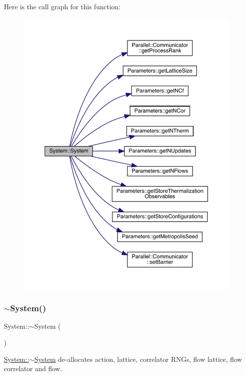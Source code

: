 Here is the call graph for this function\+:\nopagebreak
\begin{figure}[H]
\begin{center}
\leavevmode
\includegraphics[width=350pt]{class_system_ae317936c9bcf1374d61745572e0f2f8a_cgraph}
\end{center}
\end{figure}
\mbox{\label{class_system_a3be70bb338e3f062f821173fd15680d0}} 
\subsubsection{\texorpdfstring{$\sim$System()}{~System()}}
{\footnotesize\ttfamily System\+::$\sim$\+System (\begin{DoxyParamCaption}{ }\end{DoxyParamCaption})}



\mbox{\hyperlink{class_system_a3be70bb338e3f062f821173fd15680d0}{System\+::$\sim$\+System}} de-\/allocates action, lattice, correlator R\+N\+Gs, flow lattice, flow correlator and flow. 




